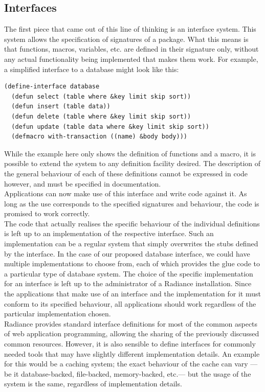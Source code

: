 \documentclass{sig-alternate}
\begin{document}
\subsection{Interfaces}
The first piece that came out of this line of thinking is an interface system. This system allows the specification of signatures of a package. What this means is that functions, macros, variables, etc. are defined in their signature only, without any actual functionality being implemented that makes them work. For example, a simplified interface to a database might look like this:

\begin{verbatim}
(define-interface database
  (defun select (table where &key limit skip sort))
  (defun insert (table data))
  (defun delete (table where &key limit skip sort))
  (defun update (table data where &key limit skip sort))
  (defmacro with-transaction ((name) &body body)))
\end{verbatim}

While the example here only shows the definition of functions and a macro, it is possible to extend the system to any definition facility desired. The description of the general behaviour of each of these definitions cannot be expressed in code however, and must be specified in documentation. \\

Applications can now make use of this interface and write code against it. As long as the use corresponds to the specified signatures and behaviour, the code is promised to work correctly. \\

The code that actually realises the specific behaviour of the individual definitions is left up to an implementation of the respective interface. Such an implementation can be a regular system that simply overwrites the stubs defined by the interface. In the case of our proposed database interface, we could have multiple implementations to choose from, each of which provides the glue code to a particular type of database system. The choice of the specific implementation for an interface is left up to the administrator of a Radiance installation. Since the applications that make use of an interface and the implementation for it must conform to its specified behaviour, all applications should work regardless of the particular implementation chosen. \\

Radiance provides standard interface definitions for most of the common aspects of web application programming, allowing the sharing of the previously discussed common resources. However, it is also sensible to define interfaces for commonly needed tools that may have slightly different implementation details. An example for this would be a caching system; the exact behaviour of the cache can vary ---be it database-backed, file-backed, memory-backed, etc.--- but the usage of the system is the same, regardless of implementation details. \\
\end{document}
